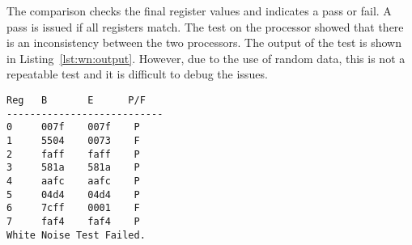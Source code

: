 The comparison checks the final register values and indicates a pass or fail. 
A pass is issued if all registers match. 
The test on the processor showed that there is an inconsistency between the two processors. 
The output of the test is shown in Listing~\ref{lst:wn:output}.
However, due to the use of random data, this is not a repeatable test and it is difficult to debug the issues. 

%

\newpage
\begin{lstlisting}[label=lst:wn:output,caption={Output of the white noise test}]
Reg   B       E      P/F
---------------------------
0     007f    007f    P
1     5504    0073    F
2     faff    faff    P
3     581a    581a    P
4     aafc    aafc    P
5     04d4    04d4    P
6     7cff    0001    F
7     faf4    faf4    P
White Noise Test Failed.
\end{lstlisting}

